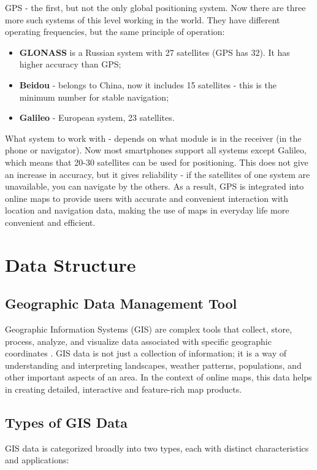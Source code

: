 \documentclass[10pt,oneside,english,a4paper]{article}
\begin{document}
GPS - the first, but not the only global positioning system. Now there are three more such systems of this level working in the world. They have different operating frequencies, but the same principle of operation:

\begin{itemize}
\item \textbf{GLONASS} is a Russian system with 27 satellites (GPS has 32). It has higher accuracy than GPS;
\item \textbf{Beidou} - belongs to China, now it includes 15 satellites - this is the minimum number for stable navigation;
\item \textbf{Galileo} - European system, 23 satellites.
\end{itemize}

What system to work with - depends on what module is in the receiver (in the phone or navigator). Now most smartphones support all systems except Galileo, which means that 20-30 satellites can be used for positioning. This does not give an increase in accuracy, but it gives reliability - if the satellites of one system are unavailable, you can navigate by the others. As a result, GPS is integrated into online maps to provide users with accurate and convenient interaction with location and navigation data, making the use of maps in everyday life more convenient and efficient.

\section{Data Structure} \label{data}

\subsection {Geographic Data Management Tool} \label{data:gis}
Geographic Information Systems (GIS) are complex tools that collect, store, process, analyze, and visualize data associated with specific geographic coordinates \cite{LandId2021}. GIS data is not just a collection of information; it is a way of understanding and interpreting landscapes, weather patterns, populations, and other important aspects of an area. In the context of online maps, this data helps in creating detailed, interactive and feature-rich map products.

\subsection {Types of GIS Data} \label{data:types}
GIS data is categorized broadly into two types, each with distinct characteristics and applications\cite{Chang2016}:
\end{document}

